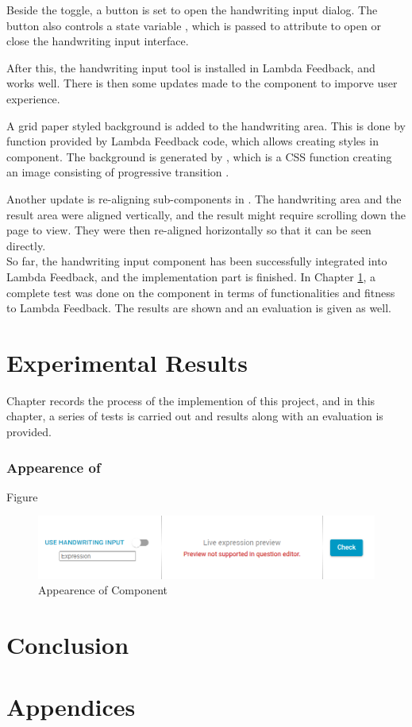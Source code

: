 \documentclass[12pt,twoside]{report}
\begin{document}
Beside the toggle, a button is set to open the handwriting input dialog. The
button also controls a state variable , which is passed to
attribute  to open or close the handwriting input interface.

After this, the handwriting input tool is installed in Lambda Feedback, and
works well. There is then some updates made to the component to imporve user
experience.

A grid paper styled background is added to the handwriting area. This is done by
 function provided by Lambda Feedback code, which allows
creating styles in component. The background is generated by
, which is a CSS function creating an image consisting of
progressive transition \cite{web:gradientfunction}.

Another update is re-aligning sub-components in . The
handwriting area and the result area were aligned vertically, and the result
might require scrolling down the page to view. They were then re-aligned
horizontally so that it can be seen directly.
\\

So far, the handwriting input component has been successfully integrated into
Lambda Feedback, and the implementation part is finished. In Chapter
\ref{Results}, a complete test was done on the component in terms of
functionalities and fitness to Lambda Feedback. The results are shown and an
evaluation is given as well.



\chapter{Experimental Results}
\label{Results}
Chapter  records the process of the implemention of this project, and in this chapter, a series of tests is carried out and results along with an evaluation is provided.

\subsection*{Appearence of }
Figure 
\begin{figure}[h]
    \centering
    \includegraphics[width=\linewidth, frame]{figures/component-appearence.png}
    \caption{Appearence of Component }
    \label{fig:component-appearence}
\end{figure}


\chapter{Conclusion}
\label{Conclusion}





\chapter{Appendices}
\label{Appendices}
\end{document}

